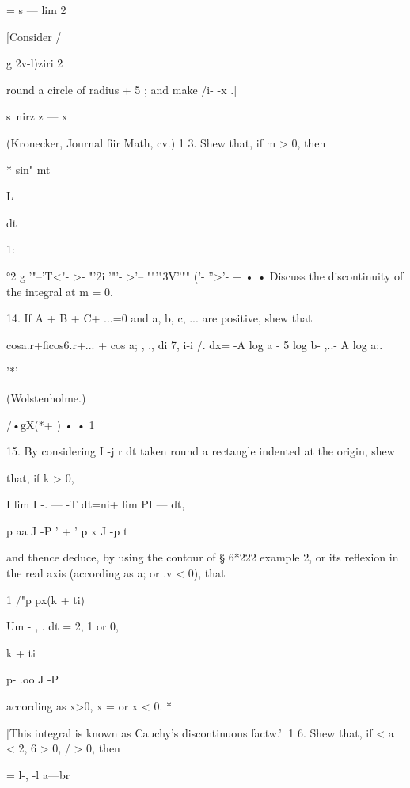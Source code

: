 {= s — lim 2



[Consider /



g 2v-l)ziri 2

round a circle of radius + 5 ; and make /i- -x .]



s\ nirz z — x

(Kronecker, Journal fiir Math, cv.) 1 3. Shew that, if m > 0, then

* sin" mt



L



dt



1:



°2 g '"--'T<"- >- "'2i '"'- >'-- ""'"3V''"" ('- ''>'- + • • Discuss
the discontinuity of the integral at m = 0.

14. If A + B + C+ ...=0 and a, b, c, ... are positive, shew that

 cosa.r+ficos6.r+... + cos a; , ., di 7, i-i /. dx= -A log a - 5 log
b- ,..- A log a:.

'*'

(Wolstenholme.)

/•gX(*+ ) • • 1

15. By considering I -j r dt taken round a rectangle indented at the
origin, shew

that, if k > 0,

I lim I -. — -T dt=ni+ lim PI — dt,

p aa J -P ' + ' p x J -p t

and thence deduce, by using the contour of § 6*222 example 2, or its
reflexion in the real axis (according as a; or .v < 0), that



1 /"p px(k + ti)

Um - , . dt = 2, 1 or 0,



k + ti



p- .oo J -P

according as x>0, x = or x < 0. *

[This integral is known as Cauchy's discontinuous factw.'] 1 6. Shew
that, if < a < 2, 6 > 0, / > 0, then

= l-, -l a—br



}
